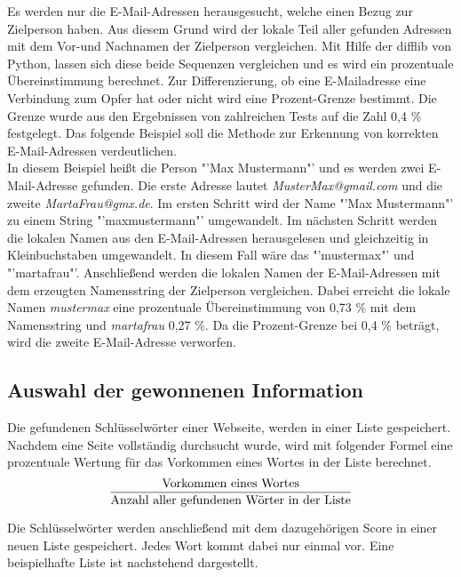 	Es werden nur die E-Mail-Adressen herausgesucht, welche einen Bezug zur Zielperson haben. Aus diesem Grund wird der lokale Teil aller gefunden Adressen mit dem Vor-und Nachnamen der Zielperson vergleichen. Mit Hilfe der difflib von Python, lassen sich diese beide Sequenzen vergleichen und es wird ein prozentuale Übereinstimmung berechnet. Zur Differenzierung, ob eine E-Mailadresse eine Verbindung zum Opfer hat oder nicht wird eine Prozent-Grenze bestimmt. Die Grenze wurde aus den Ergebnissen von zahlreichen Tests auf die Zahl 0,4 \% festgelegt. Das folgende Beispiel soll die Methode zur Erkennung von korrekten E-Mail-Adressen verdeutlichen.\\
	In diesem Beispiel heißt die Person "'Max Mustermann"' und es werden zwei E-Mail-Adresse gefunden. Die erste Adresse lautet \textit{MusterMax@gmail.com} und die zweite \textit{MartaFrau@gmx.de}. Im ersten Schritt wird der Name "'Max Mustermann"' zu einem String "'maxmustermann"' umgewandelt. Im nächsten Schritt werden die lokalen Namen aus den E-Mail-Adressen herausgelesen und gleichzeitig in Kleinbuchstaben umgewandelt. In diesem Fall wäre das "'mustermax"' und "'martafrau"'. Anschließend werden die lokalen Namen der E-Mail-Adressen mit dem erzeugten Namensstring der Zielperson vergleichen. Dabei erreicht die lokale Namen \textit{mustermax} eine prozentuale Übereinstimmung von 0,73 \% mit dem Namensstring und \textit{martafrau} 0,27 \%. Da die Prozent-Grenze bei 0,4 \% beträgt, wird die zweite E-Mail-Adresse verworfen.
	
	\subsection{Auswahl der gewonnenen Information}
	Die gefundenen Schlüsselwörter einer Webseite, werden in einer Liste gespeichert. Nachdem eine Seite vollständig durchsucht wurde, wird mit folgender Formel eine prozentuale Wertung für das Vorkommen eines Wortes in der Liste berechnet.
	\begin{align}%
	\begin{split}%
	&\frac{\text{Vorkommen eines Wortes}}{\text{Anzahl aller gefundenen Wörter in der Liste}}\\[0.25\baselineskip]%
	\end{split}
	\end{align}
	Die Schlüsselwörter werden anschließend mit dem dazugehörigen Score in einer neuen Liste gespeichert. Jedes Wort kommt dabei nur einmal vor. Eine beispielhafte Liste ist nachstehend dargestellt.
	
